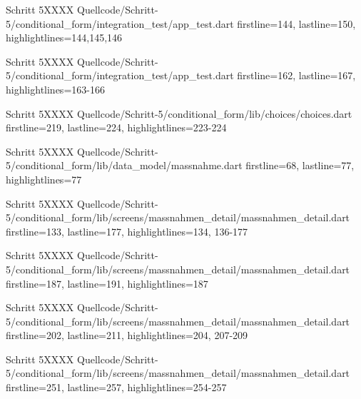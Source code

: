 
\begin{alexlisting}{Schritt 5}{XXXX}
    {Quellcode/Schritt-5/conditional_form/integration_test/app_test.dart}
    {firstline=144, lastline=150, highlightlines={144,145,146}}
    \label{lst:Schritt5XXXX}
  \end{alexlisting}

  
\begin{alexlisting}{Schritt 5}{XXXX}
    {Quellcode/Schritt-5/conditional_form/integration_test/app_test.dart}
    {firstline=162, lastline=167, highlightlines={163-166}}
    \label{lst:Schritt5XXXX}
  \end{alexlisting}

  \begin{alexlisting}{Schritt 5}{XXXX}
    {Quellcode/Schritt-5/conditional_form/lib/choices/choices.dart}
    {firstline=219, lastline=224, highlightlines={223-224}}
    \label{lst:Schritt5XXXX}
  \end{alexlisting}

  \begin{alexlisting}{Schritt 5}{XXXX}
    {Quellcode/Schritt-5/conditional_form/lib/data_model/massnahme.dart}
    {firstline=68, lastline=77, highlightlines={77}}
    \label{lst:Schritt5XXXX}
  \end{alexlisting}

  \begin{alexlisting}{Schritt 5}{XXXX}
    {Quellcode/Schritt-5/conditional_form/lib/screens/massnahmen_detail/massnahmen_detail.dart}
    {firstline=133, lastline=177, highlightlines={134, 136-177}}
    \label{lst:Schritt5XXXXX}
  \end{alexlisting}

  \begin{alexlisting}{Schritt 5}{XXXX}
    {Quellcode/Schritt-5/conditional_form/lib/screens/massnahmen_detail/massnahmen_detail.dart}
    {firstline=187, lastline=191, highlightlines={187}}
    \label{lst:Schritt5XXXXX}
  \end{alexlisting}

  \begin{alexlisting}{Schritt 5}{XXXX}
    {Quellcode/Schritt-5/conditional_form/lib/screens/massnahmen_detail/massnahmen_detail.dart}
    {firstline=202, lastline=211, highlightlines={204, 207-209}}
    \label{lst:Schritt5XXXXX}
  \end{alexlisting}

  \begin{alexlisting}{Schritt 5}{XXXX}
    {Quellcode/Schritt-5/conditional_form/lib/screens/massnahmen_detail/massnahmen_detail.dart}
    {firstline=251, lastline=257, highlightlines={254-257}}
    \label{lst:Schritt5XXXXX}
  \end{alexlisting}


